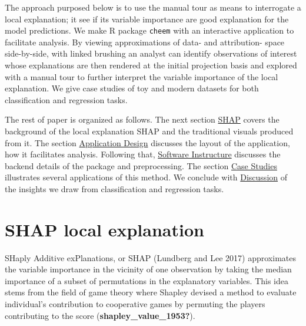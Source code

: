 \documentclass[
]{article}
\begin{document}
The approach purposed below is to use the manual tour as means to interrogate a local explanation; it see if its variable importance are good explanation for the model predictions. We make R package \texttt{cheem} with an interactive application to facilitate analysis. By viewing approximations of data- and attribution- space side-by-side, with linked brushing an analyst can identify observations of interest whose explanations are then rendered at the initial projection basis and explored with a manual tour to further interpret the variable importance of the local explanation. We give case studies of toy and modern datasets for both classification and regression tasks.

The rest of paper is organized as follows. The next section \protect\hyperlink{sec:SHAP}{SHAP} covers the background of the local explanation SHAP and the traditional visuals produced from it. The section \protect\hyperlink{sec:applicationdesign}{Application Design} discusses the layout of the application, how it facilitates analysis. Following that, \protect\hyperlink{sec:softwareinfrastructure}{Software Instructure} discusses the backend details of the package and preprocessing. The section \protect\hyperlink{sec:casestudies}{Case Studies} illustrates several applications of this method. We conclude with \protect\hyperlink{sec:discussion}{Discussion} of the insights we draw from classification and regression tasks.

\hypertarget{sec:SHAP}{%
\section{SHAP local explanation}\label{sec:SHAP}}

SHaply Additive exPlanations, or SHAP (Lundberg and Lee 2017) approximates the variable importance in the vicinity of one observation by taking the median importance of a subset of permutations in the explanatory variables. This idea stems from the field of game theory where Shapley devised a method to evaluate individual's contribution to cooperative games by permuting the players contributing to the score (\textbf{shapley\_value\_1953?}).
\end{document}
